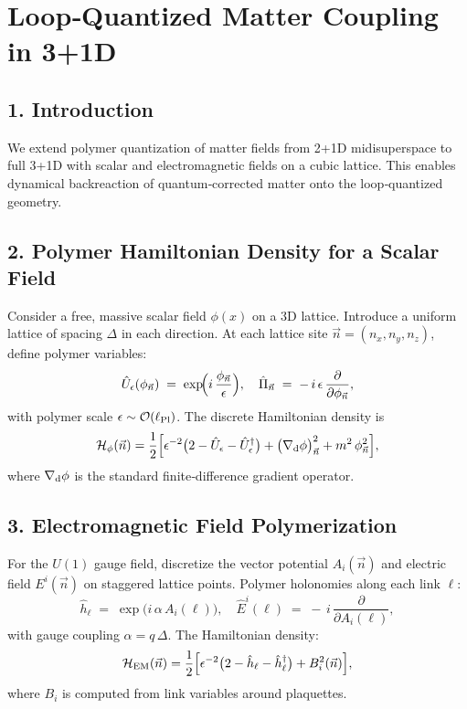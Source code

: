\documentclass[12pt]{article}
\begin{document}
\section*{Loop‐Quantized Matter Coupling in 3+1D}

\subsection*{1. Introduction}
We extend polymer quantization of matter fields from 2+1D midisuperspace to full 3+1D with scalar and electromagnetic fields on a cubic lattice.  This enables dynamical backreaction of quantum‐corrected matter onto the loop‐quantized geometry.

\subsection*{2. Polymer Hamiltonian Density for a Scalar Field}
Consider a free, massive scalar field $\phi(x)$ on a 3D lattice.  Introduce a uniform lattice of spacing $\Delta$ in each direction.  At each lattice site $\vec{n}=(n_x,n_y,n_z)$, define polymer variables:
\[
  \hat{U}_{\epsilon}(\phi_{\vec{n}})\;=\;\exp\!\Bigl(i\,\frac{\phi_{\vec{n}}}{\epsilon}\Bigr), 
  \quad 
  \hat{\Pi}_{\vec{n}} \;=\; -\,i\,\epsilon\,\frac{\partial}{\partial \phi_{\vec{n}}}, 
\]
with polymer scale $\epsilon \sim \mathcal{O}(\ell_{\rm Pl})$.  The discrete Hamiltonian density is
\[
  \mathcal{H}_{\phi}(\vec{n}) 
  = \frac{1}{2}\Bigl[
    \epsilon^{-2}\bigl(2 - \hat{U}_\epsilon - \hat{U}_\epsilon^\dagger\bigr) 
    + \bigl(\nabla_{\rm d}\phi\bigr)^2_{\vec{n}} + m^2\,\phi_{\vec{n}}^2
  \Bigr],
\]
where $\nabla_{\rm d}\phi$ is the standard finite‐difference gradient operator.

\subsection*{3. Electromagnetic Field Polymerization}
For the $U(1)$ gauge field, discretize the vector potential $A_i(\vec{n})$ and electric field $E^i(\vec{n})$ on staggered lattice points.  Polymer holonomies along each link $\ell$:
\[
  \hat{h}_\ell \;=\; \exp\!\bigl(i\,\alpha\,A_i(\ell)\bigr), 
  \quad 
  \hat{E}^i(\ell) \;=\; -\,i\,\frac{\partial}{\partial A_i(\ell)},
\]
with gauge coupling $\alpha = q\,\Delta$.  The Hamiltonian density:
\[
  \mathcal{H}_{\rm EM}(\vec{n}) 
  = \frac{1}{2}\Bigl[
    \epsilon^{-2}\bigl(2 - \hat{h}_\ell - \hat{h}_\ell^\dagger\bigr) 
    + B_i^2(\vec{n})
  \Bigr],
\]
where $B_i$ is computed from link variables around plaquettes.
\end{document}

